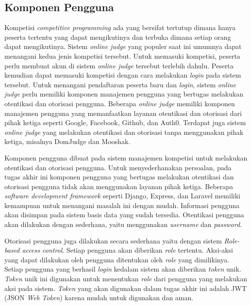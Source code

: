 \subsection{Komponen Pengguna}

\par Kompetisi \textit{competitive programming} ada yang bersifat tertutup dimana hanya peserta tertentu yang dapat mengikutinya dan terbuka dimana setiap orang dapat mengikutinya. Sistem \textit{online judge} yang populer saat ini umumnya dapat menangani kedua jenis kompetisi tersebut. Untuk memasuki kompetisi, peserta perlu membuat akun di sistem \textit{online judge} tersebut terlebih dahulu. Peserta kemudian dapat memasuki kompetisi dengan cara melakukan \textit{login} pada sistem tersebut. Untuk menangani pendaftaran peserta baru dan \textit{login}, sistem \textit{online judge} perlu memiliki komponen manajemen pengguna yang bertugas melakukan otentikasi dan otorisasi pengguna. Beberapa \textit{online judge} memiliki komponen manajemen pengguna yang memanfaatkan layanan otentikasi dan otorisasi dari pihak ketiga seperti Google, Facebook, Github, dan Auth0. Terdapat juga sistem \textit{online judge} yang melakukan otentikasi dan otorisasi tanpa menggunakan pihak ketiga, misalnya DomJudge dan Mooshak.

\par Komponen pengguna dibuat pada sistem manajemen kompetisi untuk melakukan otentikasi dan otorisasi pengguna. Untuk menyederhanakan persoalan, pada tugas akhir ini komponen pengguna yang bertugas melakukan otentikasi dan otorisasi pengguna tidak akan menggunakan layanan pihak ketiga. Beberapa \textit{software development framework} seperti Django, Express, dan Laravel memiliki kemampuan untuk menangani masalah ini dengan mudah. Informasi pengguna akan disimpan pada sistem basis data yang sudah tersedia. Otentikasi pengguna akan dilakukan dengan sederhana, yaitu menggunakan \textit{username} dan \textit{password}.

\par Otorisasi pengguna juga dilakukan secara sederhana yaitu dengan sistem \textit{Role-based access control}. Setiap pengguna akan diberikan \textit{role} tertentu. Aksi-aksi yang dapat dilakukan oleh pengguna ditentukan oleh \textit{role} yang dimilikinya. Setiap pengguna yang berhasil \textit{login} kedalam sistem akan diberikan \textit{token} unik. \textit{Token} unik ini digunakan untuk menentukan \textit{role} dari pengguna yang melakukan aksi pada sistem. \textit{Token} yang akan digunakan dalam tugas akhir ini adalah JWT (JSON \textit{Web Token}) karena mudah untuk digunakan dan aman.

